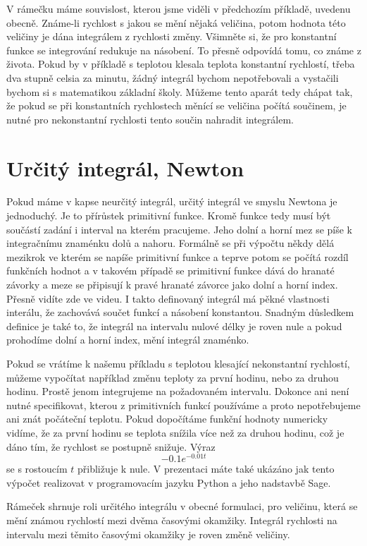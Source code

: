 \documentclass[12pt]{article}
\begin{document}
V rámečku máme souvislost, kterou jsme viděli v předchozím příkladě, uvedenu obecně. Známe-li rychlost s jakou se mění nějaká veličina, potom hodnota této veličiny je dána integrálem z rychlosti změny. Všimněte si, že pro konstantní funkce se integrování redukuje na násobení. To přesně odpovídá tomu, co známe z života. Pokud by v příkladě s teplotou klesala teplota konstantní rychlostí, třeba dva stupně celsia za minutu, žádný integrál bychom nepotřebovali a vystačili bychom si s matematikou základní školy. Můžeme tento aparát tedy chápat tak, že pokud se při konstantních rychlostech měnící se veličina počítá součinem, je nutné pro nekonstantní rychlosti tento součin nahradit integrálem.

\section*{Určitý integrál, Newton}

Pokud máme v kapse neurčitý integrál, určitý integrál ve smyslu Newtona je jednoduchý. Je to přírůstek primitivní funkce. Kromě funkce tedy musí být součástí zadání i interval na kterém pracujeme. Jeho dolní a horní mez se píše k integračnímu znaménku dolů a nahoru. Formálně se při výpočtu někdy dělá mezikrok ve kterém se napíše primitivní funkce a teprve potom se počítá rozdíl funkčních hodnot a v takovém případě se primitivní funkce dává do hranaté závorky a meze se připisují k pravé hranaté závorce jako dolní a horní index. Přesně vidíte zde ve videu. I takto definovaný integrál má pěkné vlastnosti interálu, že zachovává součet funkcí a násobení konstantou. Snadným důsledkem definice je také to, že integrál na intervalu nulové délky je roven nule a pokud prohodíme dolní a horní index, mění integrál znaménko. 

Pokud se vrátíme k našemu příkladu s teplotou klesající nekonstantní rychlostí, můžeme vypočítat například změnu teploty za první hodinu, nebo za druhou hodinu. Prostě jenom integrujeme na požadovaném intervalu. Dokonce ani není nutné specifikovat, kterou z primitivních funkcí používáme a proto nepotřebujeme ani znát počáteční teplotu. Pokud dopočítáme funkční hodnoty numericky vidíme, že za první hodinu se teplota snížila více než za druhou hodinu, což je dáno tím, že rychlost se postupně snižuje. Výraz $$-0.1 e^{-0.01t}$$ se s rostoucím $t$ přibližuje k nule. V prezentaci máte také ukázáno jak tento výpočet realizovat v programovacím jazyku Python a jeho nadstavbě Sage.

Rámeček shrnuje roli určitého integrálu v obecné formulaci, pro veličinu, která se mění známou rychlostí mezi dvěma časovými okamžiky. Integrál rychlosti na intervalu mezi těmito časovými okamžiky je roven změně veličiny.
\end{document}
